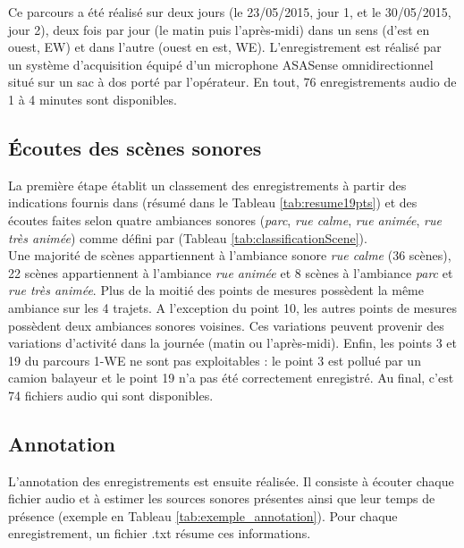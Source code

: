 Ce parcours a été réalisé sur deux jours (le 23/05/2015, jour 1, et le 30/05/2015, jour 2), deux fois par jour (le matin puis l'après-midi) dans un sens (d'est en ouest, EW) et dans l'autre (ouest en est, WE). L'enregistrement est réalisé par un système d'acquisition équipé d'un microphone ASASense omnidirectionnel situé sur un sac à dos porté par l'opérateur. En tout, 76 enregistrements audio de 1 à 4 minutes sont disponibles. \\




\subsection{Écoutes des scènes sonores}

La première étape établit un classement des enregistrements à partir des indications fournis dans \cite{aumond_modelling_2017} (résumé dans le Tableau \ref{tab:resume19pts}) et des écoutes faites selon quatre ambiances sonores (\textit{parc}, \textit{rue calme}, \textit{rue animée}, \textit{rue très animée}) comme défini par \cite{can_describing_2015} (Tableau \ref{tab:classificationScene}).\\




Une majorité de scènes appartiennent à l'ambiance sonore \textit{rue calme} (36 scènes), 22 scènes appartiennent à l'ambiance \textit{rue animée} et 8 scènes à l'ambiance \textit{parc} et \textit{rue très animée}. Plus de la moitié des points de mesures possèdent la même ambiance sur les 4 trajets. A l'exception du point 10, les autres points de mesures possèdent deux ambiances sonores voisines. Ces variations peuvent provenir des variations d'activité dans la journée (matin ou l'après-midi). Enfin, les points 3 et 19 du parcours 1-WE ne sont pas exploitables : le point 3 est pollué par un camion balayeur et le point 19 n'a pas été correctement enregistré. Au final, c'est 74 fichiers audio qui sont disponibles. 

\subsection{Annotation}\label{part:scene_annotation}

L'annotation des enregistrements est ensuite réalisée. Il consiste à écouter chaque fichier audio et à estimer les sources sonores présentes ainsi que leur temps de présence (exemple en Tableau \ref{tab:exemple_annotation}). Pour chaque enregistrement, un fichier .txt résume ces informations.\\

